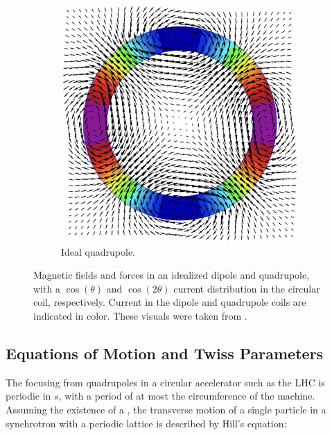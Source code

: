 \begin{figure}[!hbt]
\begin{center}
\begin{subfigure}[b]{0.45\textwidth}
\begin{center}
        \includegraphics[width=\textwidth]{Figures/Beam_Dynamics_Theory/ideal_quadrupole_cos_2theta.png}
        \caption{Ideal quadrupole.}
        \label{fig:ideal_quadrupole}
        \end{center}
    \end{subfigure}
    \caption{Magnetic fields and forces in an idealized dipole and quadrupole, with a \(\cos(\theta)\) and \(\cos(2\theta)\) current distribution in the circular coil, respectively. Current in the dipole and quadrupole coils are indicated in color. These visuals were taken from \cite{CERN:Russenschuck:CAS_Design_Magnets}.}
    \label{figure:dipole_quadrupole_fields}
    \end{center}
\end{figure}

\subsection{Equations of Motion and Twiss Parameters}
\label{subsection:equations_of_motion_and_twiss_parameters}

The focusing from quadrupoles in a circular accelerator such as the LHC is periodic in \(s\), with a period of at most the circumference of the machine.
Assuming the existence of a , the transverse motion of a single particle in a synchrotron with a periodic lattice is described by Hill's equation:


